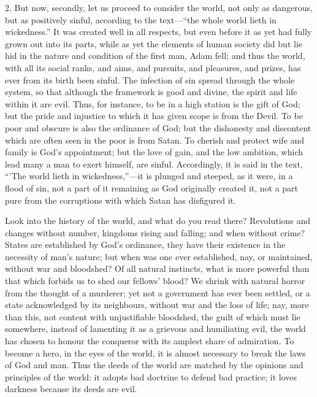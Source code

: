 2. But now, secondly, let us proceed to consider the world, not
only as dangerous, but as positively sinful, according to the text—``the
whole world lieth in wickedness.'' It was created well in all
respects, but even before it as yet had fully grown out into its
parts, while as yet the elements of human society did but lie hid in
the nature and condition of the first man, Adam fell; and thus the
world, with all its social ranks, and aims, and pursuits, and
pleasures, and prizes, has ever from its birth been sinful. The
infection of sin spread through the whole system, so that although the
framework is good and divine, the spirit and life within it are evil.
Thus, for instance, to be in a high station is the gift of God; but
the pride and injustice to which it has given scope is from the Devil.
To be poor and obscure is also the ordinance of God; but the
dishonesty and discontent which are often seen in the poor is from
Satan. To cherish and protect wife and family is God's appointment;
but the love of gain, and the low ambition, which lead many a man to
exert himself, are sinful. Accordingly, it is said in the text,
``'The world lieth in wickedness,''—it is plunged and
steeped, as it were, in a flood of sin, not a part of it remaining as
God originally created it, not a part pure from the corruptions with
which Satan has disfigured it.

Look into the history of the world, and what do you read there?
Revolutions and changes without number, kingdoms rising and falling;
and when without crime? States are established by God's ordinance,
they have their existence in the necessity of man's nature; but when
was one ever established, nay, or maintained, without war and
bloodshed? Of all natural instincts, what is more powerful than that
which forbids us to shed our fellows' blood? We shrink with natural
horror from the thought of a murderer; yet not a government has ever
been settled, or a state acknowledged by its neighbours, without war
and the loss of life; nay, more than this, not content with
unjustifiable bloodshed, the guilt of which must lie somewhere,
instead of lamenting it as a grievous and humiliating evil, the world
has chosen to honour the conqueror with its amplest share of
admiration. To become a hero, in the eyes of the world, it is almost
necessary to break the laws of God and man. Thus the deeds of the
world are matched by the opinions and principles of the world: it
adopts bad doctrine to defend bad practice; it loves darkness because
its deeds are evil.

